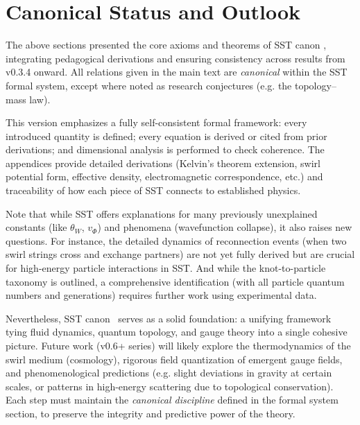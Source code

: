 \documentclass[10pt,reprint,aps,onecolumn,nofootinbib]{revtex4-2}
\begin{document}

    \section{Canonical Status and Outlook}
    The above sections presented the core axioms and theorems of SST canon \canonversion, integrating pedagogical derivations and ensuring consistency across results from v0.3.4 onward. All relations given in the main text are \emph{canonical} within the SST formal system, except where noted as research conjectures (e.g. the topology–mass law).

    This version emphasizes a fully self-consistent formal framework: every introduced quantity is defined; every equation is derived or cited from prior derivations; and dimensional analysis is performed to check coherence. The appendices provide detailed derivations (Kelvin’s theorem extension, swirl potential form, effective density, electromagnetic correspondence, etc.) and traceability of how each piece of SST connects to established physics.

    Note that while SST offers explanations for many previously unexplained constants (like $\theta_W$, $v_{\Phi}$) and phenomena (wavefunction collapse), it also raises new questions. For instance, the detailed dynamics of reconnection events (when two swirl strings cross and exchange partners) are not yet fully derived but are crucial for high-energy particle interactions in SST. And while the knot-to-particle taxonomy is outlined, a comprehensive identification (with all particle quantum numbers and generations) requires further work using experimental data.

    Nevertheless, SST canon \canonversion \ serves as a solid foundation: a unifying framework tying fluid dynamics, quantum topology, and gauge theory into a single cohesive picture. Future work (v0.6+ series) will likely explore the thermodynamics of the swirl medium (cosmology), rigorous field quantization of emergent gauge fields, and phenomenological predictions (e.g. slight deviations in gravity at certain scales, or patterns in high-energy scattering due to topological conservation). Each step must maintain the \emph{canonical discipline} defined in the formal system section, to preserve the integrity and predictive power of the theory.


    \appendix
    \setcounter{section}{0}%
    \renewcommand{\thesection}{\Alph{section}}
    \renewcommand{\theHsection}{\Alph{section}} %
\end{document}
